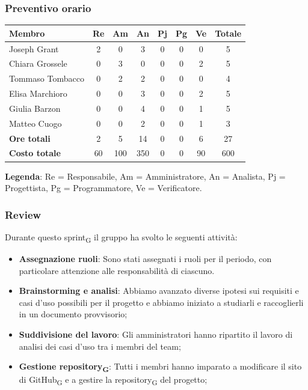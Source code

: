 \documentclass[11pt,a4paper]{article}
\newcommand{\gls}[1]{#1\textsubscript{G}}
\begin{document}
\subsubsection{Preventivo orario}
\begin{center}
    \begin{tabular}{|l|c|c|c|c|c|c|c|}
        \hline
        \textbf{Membro} & \textbf{Re} & \textbf{Am} & \textbf{An} & \textbf{Pj} & \textbf{Pg} & \textbf{Ve} & \textbf{Totale} \\
        \hline
        Joseph Grant & 2 & 0 & 3 & 0 & 0 & 0 & 5 \\
        \hline
        Chiara Grossele & 0 & 3 & 0 & 0 & 0 & 2 & 5 \\
        \hline
        Tommaso Tombacco & 0 & 2 & 2 & 0 & 0 & 0 & 4 \\
        \hline
        Elisa Marchioro & 0 & 0 & 3 & 0 & 0 & 2 & 5 \\
        \hline
        Giulia Barzon & 0 & 0 & 4 & 0 & 0 & 1 & 5 \\
        \hline
        Matteo Cuogo & 0 & 0 & 2 & 0 & 0 & 1 & 3 \\
        \hline
        \textbf{Ore totali} & 2 & 5 & 14 & 0 & 0 & 6 & 27 \\
        \hline
        \textbf{Costo totale} & 60 & 100 & 350 & 0 & 0 & 90 & 600 \\
        \hline
    \end{tabular}
\end{center}

\noindent \textbf{Legenda}: Re = Responsabile, Am = Amministratore, An = Analista, Pj = Progettista, Pg = Programmatore, Ve = Verificatore.

\subsubsection{Review}
Durante questo \gls{sprint} il gruppo ha svolto le seguenti attività:
\begin{itemize}
    \item \textbf{Assegnazione ruoli}: Sono stati assegnati i ruoli per il periodo, con particolare attenzione alle responsabilità di ciascuno.
    \item \textbf{Brainstorming e analisi}: Abbiamo avanzato diverse ipotesi sui requisiti e casi d'uso possibili per il progetto e abbiamo iniziato a studiarli e raccoglierli in un documento provvisorio;
    \item \textbf{Suddivisione del lavoro}: Gli amministratori hanno ripartito il lavoro di analisi dei casi d'uso tra i membri del team;
    \item \textbf{Gestione \gls{repository}}: Tutti i membri hanno imparato a modificare il sito di \gls{GitHub} e a gestire la \gls{repository} del progetto;
\end{itemize}
\end{document}

